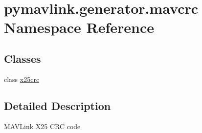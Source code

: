\hypertarget{namespacepymavlink_1_1generator_1_1mavcrc}{}\section{pymavlink.\+generator.\+mavcrc Namespace Reference}
\label{namespacepymavlink_1_1generator_1_1mavcrc}
\subsection*{Classes}
\begin{DoxyCompactItemize}
\item 
class \hyperlink{classpymavlink_1_1generator_1_1mavcrc_1_1x25crc}{x25crc}
\end{DoxyCompactItemize}


\subsection{Detailed Description}
\begin{DoxyVerb}MAVLink X25 CRC code\end{DoxyVerb}
 